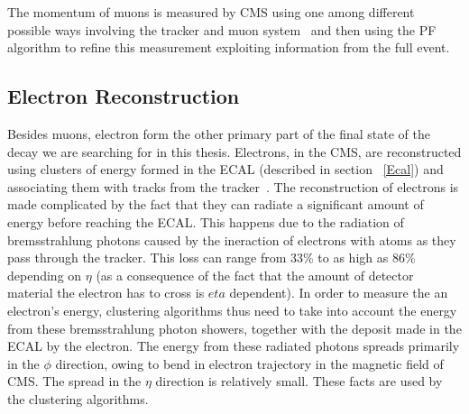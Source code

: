 The momentum of muons is measured by CMS using one among different possible ways involving the tracker and muon system~\cite{muon_recon2012} and then using the PF algorithm to refine this measurement exploiting information from the full event.



\subsection{Electron Reconstruction}
\label{e_recon}
Besides muons, electron form the other primary part of the final state of the decay we are searching for in this thesis. Electrons, in the CMS, are reconstructed using clusters of energy formed in the ECAL (described in section ~\ref{Ecal}) and associating them with tracks from the tracker~\cite{e_recon}. The reconstruction of electrons is made complicated by the fact that they can radiate a significant amount of energy before reaching the ECAL. This happens due to the radiation of bremsstrahlung photons caused by the ineraction of electrons with atoms as they pass through the tracker. This loss can range from 33\% to as high as 86\% depending on $\eta$ (as a consequence of the fact that the amount of detector material the electron has to cross is $eta$ dependent). In order to measure the an electron's energy,  clustering algorithms thus need to take into account the energy from these bremsstrahlung photon showers, together with the deposit made in the ECAL by the electron. The energy from these radiated photons spreads primarily in the $\phi$ direction, owing to bend in electron trajectory in the magnetic field of CMS. The spread in the $\eta$ direction is relatively small. These facts are used by the clustering algorithms.

